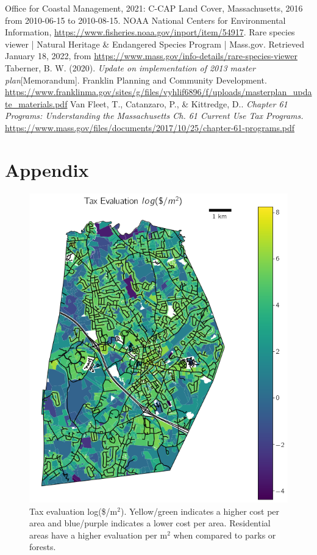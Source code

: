 \documentclass[12pt, stu, floatsintext,table]{apa7}
\begin{document}
\begin{flushleft}
Office for Coastal Management, 2021: C-CAP Land Cover, Massachusetts, 2016 from 2010-06-15 to 2010-08-15. NOAA National Centers for Environmental Information, \url{https://www.fisheries.noaa.gov/inport/item/54917}. 
\newline
\newline
Rare species viewer | Natural Heritage & Endangered Species Program | Mass.gov. Retrieved January 18, 2022, from \url{https://www.mass.gov/info-details/rare-species-viewer}
\newline
\newline
Taberner, B. W. (2020). \emph{Update on implementation of 2013 master plan}[Memorandum]. Franklin Planning and Community Development. \url{https://www.franklinma.gov/sites/g/files/vyhlif6896/f/uploads/masterplan_update_materials.pdf}  
\newline
\newline
Van Fleet, T., Catanzaro, P., \& Kittredge, D.. \emph{Chapter 61 Programs: Understanding the Massachusetts Ch. 61 Current Use Tax Programs.} \url{https://www.mass.gov/files/documents/2017/10/25/chapter-61-programs.pdf}
\end{flushleft}
\newpage

\section{Appendix}

\begin{figure}[hbtp]
    \centering
    \includegraphics[width=0.75\linewidth]{figures/landval.png}
    \caption{Tax evaluation log(\$/m$^2$). Yellow/green indicates a higher cost per area and blue/purple indicates a lower cost per area. Residential areas have a higher evaluation per m$^2$ when compared to parks or forests. }
\end{figure}
\end{document}
